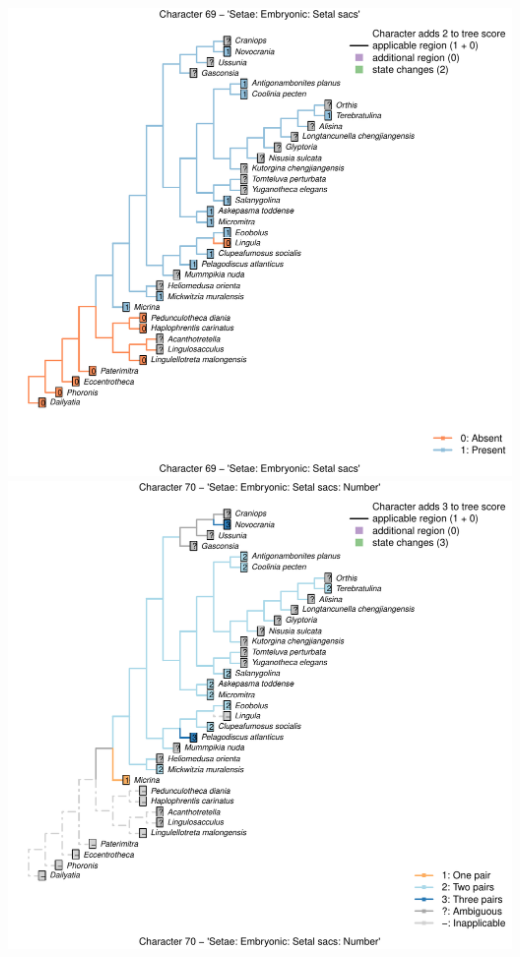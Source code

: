 \documentclass[]{book}
\theoremstyle{definition}
\theoremstyle{definition}
\theoremstyle{definition}
\theoremstyle{remark}
\begin{document}
\includegraphics{Brachiopod_phylogeny_files/figure-latex/unnamed-chunk-4-69.pdf}
\includegraphics{Brachiopod_phylogeny_files/figure-latex/unnamed-chunk-4-70.pdf}
\end{document}

